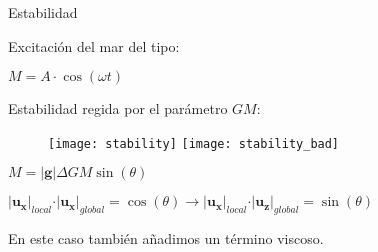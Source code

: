 \begin{frame}{Estabilidad}

Excitación del mar del tipo:

\begin{center}
$M = A \cdot \cos\left( \omega t \right)$
\end{center}

Estabilidad regida por el parámetro $GM$:

\begin{figure}
  \texttt{[image: stability]} 
  \texttt{[image: stability\_bad]} 
\end{figure}

\pause

\begin{center}
$M = \vert \mathbf{g} \vert \Delta GM \sin\left( \theta \right)$
\end{center}

\pause

$\vert \left. \mathbf{u_x} \right\vert_{local}
\cdot
\vert \left. \mathbf{u_x} \right\vert_{global} = \cos\left( \theta \right)
\longrightarrow
\vert \left. \mathbf{u_x} \right\vert_{local}
\cdot
\vert \left. \mathbf{u_z} \right\vert_{global} = \sin\left( \theta \right)$

En este caso también añadimos un término viscoso.

\end{frame}

